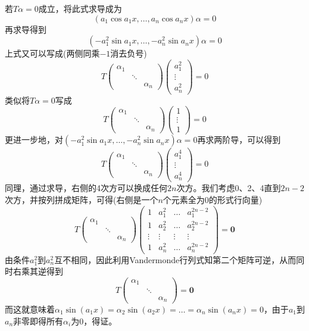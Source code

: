 \documentclass[a4paper,UTF8,fontset=windows,AutoFakeBold]{ctexart}
\begin{document}
\begin{enumerate}
    若$T\alpha=0$成立，将此式求导成为
    $$(a_1\cos a_1x,\dots,a_n\cos a_nx)\alpha=0$$
    再求导得到
    $$(-a_1^2\sin a_1x,\dots,-a_n^2\sin a_nx)\alpha=0$$
    上式又可以写成(两侧同乘$-1$消去负号)
    $$T\begin{pmatrix}\alpha_1&&\\ &\ddots&\\ &&\alpha_n\end{pmatrix}\begin{pmatrix}a_1^2\\\vdots\\a_n^2\end{pmatrix}=0$$
    类似将$T\alpha=0$写成
    $$T\begin{pmatrix}\alpha_1&&\\ &\ddots&\\ &&\alpha_n\end{pmatrix}\begin{pmatrix}1\\\vdots\\1\end{pmatrix}=0$$
    更进一步地，对$(-a_1^2\sin a_1x,\dots,-a_n^2\sin a_nx)\alpha=0$再求两阶导，可以得到
    $$T\begin{pmatrix}\alpha_1&&\\ &\ddots&\\ &&\alpha_n\end{pmatrix}\begin{pmatrix}a_1^4\\\vdots\\a_n^4\end{pmatrix}=0$$
    同理，通过求导，右侧的4次方可以换成任何$2n$次方。我们考虑0、2、4直到$2n-2$次方，并按列拼成矩阵，可得(右侧是一个$n$个元素全为0的形式行向量)
    $$T\begin{pmatrix}\alpha_1&&\\ &\ddots&\\ &&\alpha_n\end{pmatrix}\begin{pmatrix}1&a_1^2&\dots&a_1^{2n-2}\\1&a_2^2&\dots&a_2^{2n-2}\\\vdots&\vdots&\vdots&\vdots\\1&a_n^2&\dots&a_n^{2n-2}\end{pmatrix}=\mathbf{0}$$
    由条件$a_1^2$到$a_n^2$互不相同，因此利用Vandermonde行列式知第二个矩阵可逆，从而同时右乘其逆得到
    $$T\begin{pmatrix}\alpha_1&&\\ &\ddots&\\ &&\alpha_n\end{pmatrix}=\mathbf{0}$$
    而这就意味着$\alpha_1\sin(a_1x)=\alpha_2\sin(a_2x)=\dots=\alpha_n\sin(a_nx)=0$，由于$a_1$到$a_n$非零即得所有$\alpha_i$为0，得证。


\end{enumerate}
\end{document}
